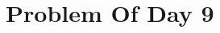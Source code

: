 \documentclass{article}
\newcommand{\YearPath}{../../../LatexConfig} %
\newcommand{\SemesterPath}{../../LatexConfig} %
\newcommand{\ClassPath}{../LatexConfig} %
\begin{document}




\section{Problem Of Day 9}

\end{document}
